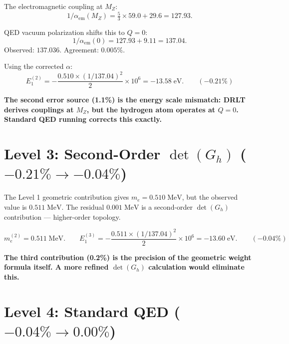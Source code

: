 \documentclass[12pt]{article}
\theoremstyle{remark}
\begin{document}
The electromagnetic coupling at $M_Z$:
\begin{equation}
1/\alpha_\text{em}(M_Z) = \tfrac{5}{3} \times 59.0 + 29.6 = 127.93.
\end{equation}

QED vacuum polarization shifts this to $Q = 0$:
\begin{equation}
1/\alpha_\text{em}(0) = 127.93 + 9.11 = 137.04.
\end{equation}
Observed: $137.036$. Agreement: $0.005\%$.

Using the corrected $\alpha$:
\begin{equation}
E_1^{(2)} = -\frac{0.510 \times (1/137.04)^2}{2} \times 10^6 = -13.58\;\text{eV}. \qquad (-0.21\%)
\end{equation}

\textbf{The second error source (1.1\%) is the energy scale mismatch: DRLT derives couplings at $M_Z$, but the hydrogen atom operates at $Q = 0$. Standard QED running corrects this exactly.}

\section{Level 3: Second-Order $\det(G_h)$ ($-0.21\% \to -0.04\%$)}

The Level 1 geometric contribution gives $m_e = 0.510\;\text{MeV}$, but the observed value is $0.511\;\text{MeV}$. The residual $0.001\;\text{MeV}$ is a second-order $\det(G_h)$ contribution --- higher-order topology.

\begin{equation}
m_e^{(2)} = 0.511\;\text{MeV}. \qquad E_1^{(3)} = -\frac{0.511 \times (1/137.04)^2}{2} \times 10^6 = -13.60\;\text{eV}. \qquad (-0.04\%)
\end{equation}

\textbf{The third contribution (0.2\%) is the precision of the geometric weight formula itself. A more refined $\det(G_h)$ calculation would eliminate this.}

\section{Level 4: Standard QED ($-0.04\% \to 0.00\%$)}
\end{document}
